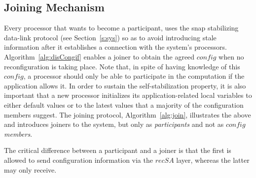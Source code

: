 \documentclass[11pt]{article}
\begin{document}
\subsection{Joining Mechanism}
\label{sec:join}
Every processor that wants to become a participant, uses the snap stabilizing data-link protocol (see Section~\ref{s:sys}) so as to avoid introducing stale information after it establishes a connection with the system's processors. 
Algorithm~\ref{alg:disCongif} enables a joiner to obtain the agreed $config$ when no reconfiguration is taking place.
Note that, in spite of having knowledge of this $config$, a processor should only be able to participate in the computation if the application allows it.
In order to sustain the self-stabilization property, it is also important that a new processor initializes its application-related local variables to either default values or to the latest values that a majority of the configuration members suggest.
The joining protocol, Algorithm~\ref{alg:join}, illustrates the above and introduces joiners to the system, but only as \emph{participants} and not as $config$ \emph{members}.

The critical difference between a participant and a joiner is that the first is allowed to send configuration information via the $recSA$ layer, whereas the latter may only receive.
\end{document}
